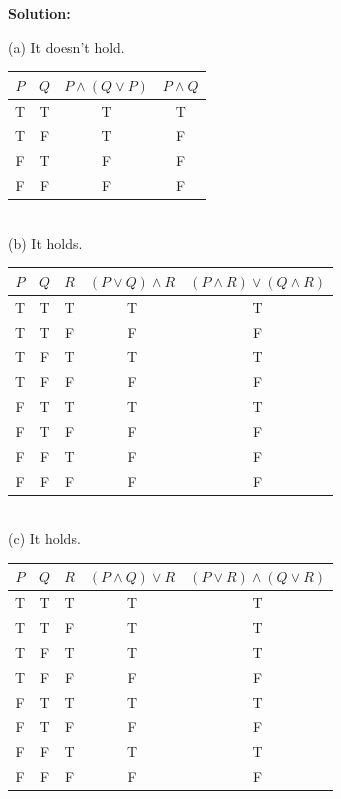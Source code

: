 \documentclass[12pt]{article}
\newenvironment{solution}{\par\noindent\textbf{Solution:}\par}{\par\vspace{1em}}
\begin{document}
\begin{solution}
    \noindent
    (a) It doesn't hold.\\
    \begin{tabular}{|c|c|c|c|}
        \hline
        $P$ & $Q$ & $P \land (Q \lor P)$ & $P \land Q$\\
        \hline
        T & T & T & T \\
        \hline
        T & F & T & F \\
        \hline
        F & T & F & F \\
        \hline
        F & F & F & F \\
        \hline
    \end{tabular}\\
    (b) It holds.\\
    \begin{tabular}{|c|c|c|c|c|}
        \hline
        $P$ & $Q$ & $R$ & $(P \lor Q) \land R$ & $(P \land R) \lor (Q \land R)$\\
        \hline
        T & T & T & T & T \\
        \hline
        T & T & F & F & F \\
        \hline
        T & F & T & T & T \\
        \hline
        T & F & F & F & F \\
        \hline
        F & T & T & T & T \\
        \hline
        F & T & F & F & F \\
        \hline
        F & F & T & F & F \\
        \hline
        F & F & F & F & F \\
        \hline
    \end{tabular}\\
    (c) It holds.\\
    \begin{tabular}{|c|c|c|c|c|}
        \hline
        $P$ & $Q$ & $R$ & $(P \land Q) \lor R$ & $(P \lor R) \land (Q \lor R)$\\
        \hline
        T & T & T & T & T \\
        \hline
        T & T & F & T & T \\
        \hline
        T & F & T & T & T \\
        \hline
        T & F & F & F & F \\
        \hline
        F & T & T & T & T \\
        \hline
        F & T & F & F & F \\
        \hline
        F & F & T & T & T \\
        \hline
        F & F & F & F & F \\
        \hline
    \end{tabular}
\end{solution}
\end{document}
